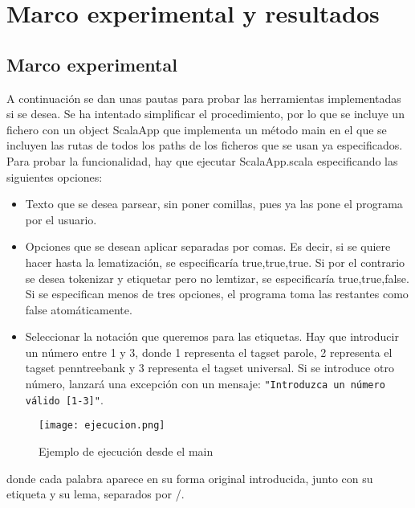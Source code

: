 \chapter{Marco experimental y resultados}
\label{conclusion}

\section{Marco experimental} 
A continuación se dan unas pautas para probar las herramientas implementadas si se desea. Se ha intentado simplificar el procedimiento, por lo que se incluye un fichero con un object \textsf{ScalaApp} que implementa un método main en el que se incluyen las rutas de todos los paths de los ficheros que se usan ya especificados. 
Para probar la funcionalidad, hay que ejecutar \textcolor{SchoolColor}{ScalaApp.scala} especificando las siguientes opciones:
\begin{itemize}
\item Texto que se desea parsear, sin poner comillas, pues ya las pone el programa por el usuario.
\item Opciones que se desean aplicar separadas por comas. Es decir, si se quiere hacer hasta la lematización, se especificaría \textsf{true,true,true}. Si por el contrario se desea tokenizar y etiquetar pero no lemtizar, se especificaría  \textsf{true,true,false}. Si se especifican menos de tres opciones, el programa toma las restantes como false atomáticamente.
\item Seleccionar la notación que queremos para las etiquetas. Hay que introducir un número entre 1 y 3, donde 1 representa el tagset parole, 2 representa el tagset penntreebank y 3 representa el tagset universal. Si se introduce otro número, lanzará una excepción con un mensaje: \texttt{"Introduzca un número válido [1-3]"}. 
\end{itemize}

\begin{figure}[H]%
\centering
\texttt{[image: ejecucion.png]}  %
\label{}
\caption{Ejemplo de ejecución desde el main}   
\end{figure}

donde cada palabra aparece en su forma original introducida, junto con su etiqueta y su lema, separados por \textsf{/}. 
